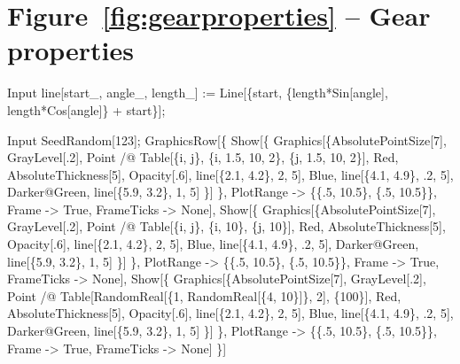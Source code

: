 \documentclass[11pt,fleqn]{book} %
\begin{document}
\section*{Figure~\ref{fig:gearproperties} -- Gear properties }
\small{
\begin{mmaCell}[index=1]{Input}
  line[start_, angle_, length_] := 
    Line[\{start, \{length*Sin[angle], length*Cos[angle]\} + start\}];
\end{mmaCell}
\begin{mmaCell}{Input}
  SeedRandom[123];
  GraphicsRow[\{
    Show[\{
      Graphics[\{AbsolutePointSize[7], GrayLevel[.2], 
        Point /@ Table[\{i, j\}, \{i, 1.5, 10, 2\}, \{j, 1.5, 10, 2\}],
        Red, AbsoluteThickness[5], Opacity[.6], line[\{2.1, 4.2\}, 2, 5],
        Blue, line[\{4.1, 4.9\}, .2, 5],
        Darker@Green, line[\{5.9, 3.2\}, 1, 5]
        \}]
      \}, 
      PlotRange  -> \{\{.5, 10.5\}, \{.5, 10.5\}\}, 
      Frame      -> True, 
      FrameTicks -> None],
    Show[\{
      Graphics[\{AbsolutePointSize[7], GrayLevel[.2], 
        Point /@ Table[\{i, j\}, \{i, 10\}, \{j, 10\}],
        Red, AbsoluteThickness[5], Opacity[.6], line[\{2.1, 4.2\}, 2, 5],
        Blue, line[\{4.1, 4.9\}, .2, 5],
        Darker@Green, line[\{5.9, 3.2\}, 1, 5]
        \}]
      \}, 
      PlotRange  -> \{\{.5, 10.5\}, \{.5, 10.5\}\}, 
      Frame      -> True, 
      FrameTicks -> None],
    Show[\{
      Graphics[\{AbsolutePointSize[7], GrayLevel[.2], 
        Point /@ Table[RandomReal[\{1, RandomReal[\{4, 10\}]\}, 2], \{100\}],
        Red, AbsoluteThickness[5], Opacity[.6], line[\{2.1, 4.2\}, 2, 5],
        Blue, line[\{4.1, 4.9\}, .2, 5],
        Darker@Green, line[\{5.9, 3.2\}, 1, 5]
        \}]
      \}, 
      PlotRange  -> \{\{.5, 10.5\}, \{.5, 10.5\}\}, 
      Frame      -> True, 
      FrameTicks -> None]
  \}]
\end{mmaCell}
}

\end{document}
